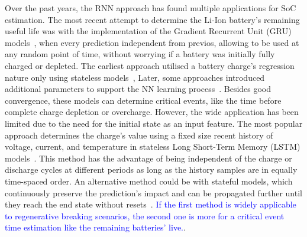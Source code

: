 % 
%
Over the past years, the RNN approach has found multiple applications for SoC estimation.
The most recent attempt to determine the Li-Ion battery's remaining useful life was with the implementation of the Gradient Recurrent Unit (GRU) models~\cite{song_lithium-ion_2018,javid_adaptive_2020,xiao_accurate_2019,jiao_gru-rnn_2020}, when every prediction independent from previos, allowing to be used at any random point of time, without worrying if a battery was initially fully charged or depleted.
The earliest approach utilised a battery charge's regression nature only using stateless models~\cite{song_lithium-ion_2018,jiao_gru-rnn_2020,xiao_accurate_2019},%
Later, some approaches introduced additional parameters to support the NN learning process~\cite{mamo_long_2020,jiao_gru-rnn_2020,javid_adaptive_2020}.
Besides good convergence, these models can determine critical events, like the time before complete charge depletion or overcharge.
However, the wide application has been limited due to the need for the initial state as an input feature.
The most popular approach determines the charge's value using a fixed size recent history of voltage, current, and temperature in stateless Long Short-Term Memory (LSTM) models~\cite{Chemali2017,mamo_long_2020,javid_adaptive_2020,zhang_deep_2020}.
This method has the advantage of being independent of the charge or discharge cycles at different periods as long as the history samples are in equally time-spaced order.
An alternative method could be with stateful models, which continuously preserve the prediction's impact and can be propagated further until they reach the end state without resets~\cite{zhu_statefulnes_tfdocs_2020}.
\textcolor{blue}{If the first method is widely applicable to regenerative breaking scenarios, the second one is more for a critical event time estimation like the remaining batteries' live.}.

